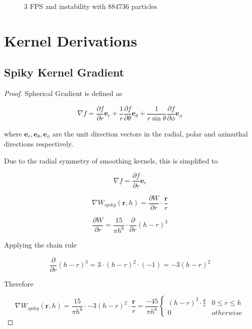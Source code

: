 \documentclass[a4paper, 12pt]{article}
\newcommand{\wideimage}[2][]{%
  \makebox[\textwidth][c]{\texttt{[image: \#2]}}%
}
\begin{document}
    \begin{figure}[H]
        \wideimage[height=0.4\textheight]{3Frames96Cubed.png}
        \caption{3 FPS and instability with 884736 particles}
    \end{figure}


    \section{Kernel Derivations}

    \subsection{Spiky Kernel Gradient}

    \begin{proof}
        Spherical Gradient is defined as

        $$\nabla f = \frac{\partial{f}}{\partial{r}}\textbf{e}_r + \frac{1}{r}\frac{\partial{f}}{\partial{\theta}}\textbf{e}_{\theta} + \frac{1}{r \sin{\theta}}\frac{\partial{f}}{\partial{\phi}}\textbf{e}_{\phi}$$
        
        where $\textbf{e}_{r}, \textbf{e}_{\theta}, \textbf{e}_{\phi}$ are the unit direction vectors in the radial, polar and azimuthal directions respectively.

        Due to the radial symmetry of smoothing kernels, this is simplified to

        $$\nabla f = \frac{\partial{f}}{\partial{r}}\textbf{e}_r$$

        $$\nabla W_{spiky}(\textbf{r}, h) = \frac{\partial{W}}{\partial{r}} \cdot \frac{\textbf{r}}{r}$$

        $$\frac{\partial{W}}{\partial{r}} = \frac{15}{\pi{h}^6} \cdot \frac{\partial}{\partial{r}} (h - r)^3$$

        Applying the chain rule

        $$\frac{\partial}{\partial{r}} (h - r)^3 = 3 \cdot (h - r)^2 \cdot (-1) = -3(h - r)^2$$

        Therefore

        $$\nabla{W_{spiky}(\textbf{r}, h)} = \frac{15}{\pi{h}^6} \cdot -3(h - r)^2 \cdot \frac{\textbf{r}}{r} = \frac{-45}{\pi{h}^6}\begin{cases}
            (h - r)^2 \cdot \frac{\textbf{r}}{r} & 0 \leq r \leq h \\
            0 & otherwise
        \end{cases}$$
    \end{proof}
\end{document}
